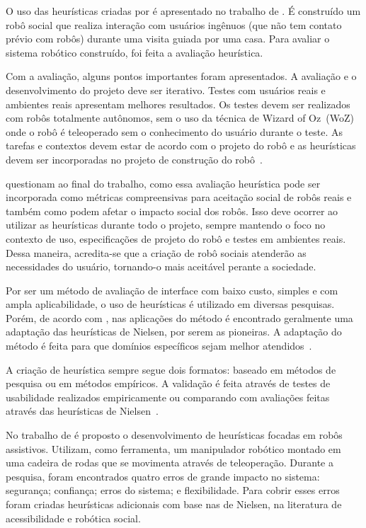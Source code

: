 O uso das heurísticas criadas por \textcite{clarkson:2007} é apresentado no trabalho de \textcite{lohse:2008}. É construído um robô social que realiza interação com usuários ingênuos (que não tem contato prévio com robôs) durante uma visita guiada por uma casa. Para avaliar o sistema robótico construído, foi feita a avaliação heurística.

Com a avaliação, alguns pontos importantes foram apresentados. A avaliação e o desenvolvimento do projeto deve ser iterativo. Testes com usuários reais e ambientes reais apresentam melhores resultados. Os testes devem ser realizados com robôs totalmente autônomos, sem o uso da técnica de Wizard of Oz~(WoZ) onde o robô é teleoperado sem o conhecimento do usuário durante o teste. As tarefas e contextos devem estar de acordo com o projeto do robô e as heurísticas devem ser incorporadas no projeto de construção do robô~\cite{lohse:2008}.

\textcite{lohse:2008} questionam ao final do trabalho, como essa avaliação heurística pode ser incorporada como métricas compreensivas para aceitação social de robôs reais e também como podem afetar o impacto social dos robôs. Isso deve ocorrer ao utilizar as heurísticas durante todo o projeto, sempre mantendo o foco no contexto de uso, especificações de projeto do robô e testes em ambientes reais. Dessa maneira, acredita-se que a criação de robô sociais atenderão as necessidades do usuário, tornando-o mais aceitável perante a sociedade.

Por ser um método de avaliação de interface com baixo custo, simples e com ampla aplicabilidade, o uso de heurísticas é utilizado em diversas pesquisas. Porém, de acordo com \textcite{tsui:2010}, nas aplicações do método é encontrado geralmente uma adaptação das heurísticas de Nielsen, por serem as pioneiras. A adaptação do método é feita para que domínios específicos sejam melhor atendidos~\cite{tsui:2010}.

A criação de heurística sempre segue dois formatos: baseado em métodos de pesquisa ou em métodos empíricos. A validação é feita através de testes de usabilidade realizados empiricamente ou comparando com avaliações feitas através das heurísticas de Nielsen~\cite{tsui:2010}.

No trabalho de \textcite{tsui:2010} é proposto o desenvolvimento de heurísticas focadas em robôs assistivos. Utilizam, como ferramenta, um manipulador robótico montado em uma cadeira de rodas que se movimenta através de teleoperação. Durante a pesquisa, foram encontrados quatro erros de grande impacto no sistema: segurança; confiança; erros do sistema; e flexibilidade. Para cobrir esses erros foram criadas heurísticas adicionais com base nas de Nielsen, na literatura de acessibilidade e robótica social.

